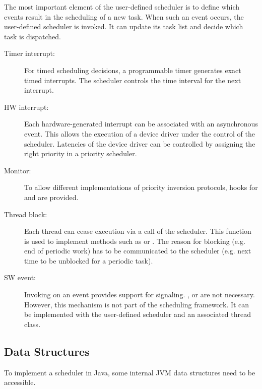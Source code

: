 The most important element of the user-defined scheduler is to
define which events result in the scheduling of a new task. When
such an event occurs, the user-defined scheduler is invoked. It can
update its task list and decide which task is dispatched.

\begin{description}

\item[Timer interrupt:] For timed scheduling decisions, a programmable
timer generates exact timed interrupts. The scheduler controls the
time interval for the next interrupt.

\item[HW interrupt:] Each hardware-generated interrupt can be associated
with an asynchronous event. This allows the execution of a device
driver under the control of the scheduler. Latencies of the device
driver can be controlled by assigning the right priority in a
priority scheduler.

\item[Monitor:] To allow different implementations of priority inversion
protocols, hooks for  and  are
provided.

\item[Thread block:] Each thread can cease execution via a call of the
scheduler. This function is used to implement methods such as
 or . The reason for
blocking (e.g. end of periodic work) has to be communicated to the
scheduler (e.g. next time to be unblocked for a periodic task).

\item[SW event:] Invoking  on an event provides support for
signaling. ,  or  are
not necessary. However, this mechanism is not part of the scheduling
framework. It can be implemented with the user-defined scheduler and
an associated thread class.

\end{description}

\subsection{Data Structures}

To implement a scheduler in Java, some internal JVM data structures
need to be accessible.

